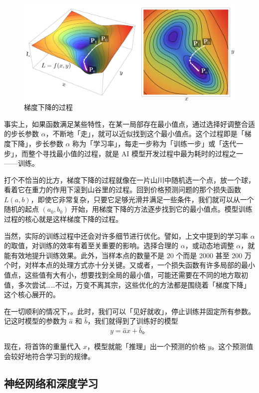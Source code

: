 \begin{figure}[htb!]
  \centering
  \includegraphics[width=.68\textwidth]{assets/surpass/GD_3.png}
  \caption{梯度下降的过程}
  \label{fig:GD_3}
\end{figure}

事实上，如果函数满足某些特性，在某一局部存在最小值点，通过选择好调整合适的步长参数 $\alpha$，不断地「走」，就可以近似找到这个最小值点。这个过程即是「梯度下降」，步长参数 $\alpha$ 称为「学习率」，每走一步称为「训练一步」或「迭代一步」，而整个寻找最小值的过程，就是 AI 模型开发过程中最为耗时的过程之一——训练。

打个不恰当的比方，梯度下降的过程就像在一片山川中随机选一个点，放一个球，看着它在重力的作用下滚到山谷里的过程。回到价格预测问题的那个损失函数 $L(a, b)$，即使它非常复杂，只要它足够光滑并满足一些条件，我们就可以从一个随机的起点 $(a_0, b_0)$ 开始，用梯度下降的方法逐步找到它的最小值点。模型训练过程的核心就是这样梯度下降的过程。

\begin{note}
  当然，实际的训练过程中还会对许多细节进行优化。譬如，上文中提到的学习率 $\alpha$ 的取值，对训练的效率有着至关重要的影响。选择合理的 $\alpha$，或动态地调整 $\alpha$，就能有效地提升训练效果。此外，当样本点的数量不是 20 个而是 2000 甚至 200 万个时，对样本点的处理方式亦十分关键。又或者，一个损失函数有许多局部的最小值点，这些值有大有小，想要找到全局的最小值，可能还需要在不同的地方取初值，多次尝试……不过，万变不离其宗，这些优化的方法都是围绕着「梯度下降」这个核心展开的。
\end{note}

在一切顺利的情况下，。此时，我们可以「见好就收」，停止训练并固定所有参数。记这时模型的参数为 $\hat{a}$ 和 $\hat{b}$，我们就得到了训练好的模型
\[
y = \hat{a}x + \hat{b}\text{。}
\]

现在，将首饰的重量代入 $x$，模型就能「推理」出一个预测的价格 $y$。这个预测值会较好地符合学习到的规律。

\subsection{神经网络和深度学习}


